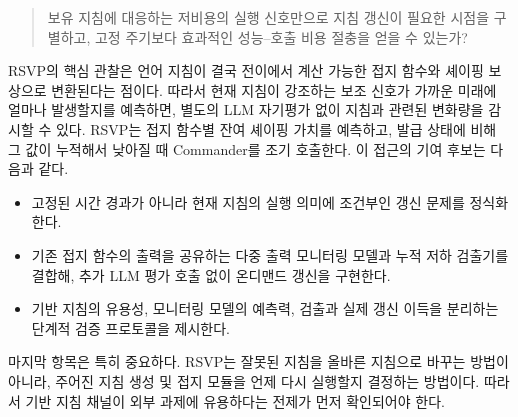 \begin{quote}
보유 지침에 대응하는 저비용의 실행 신호만으로 지침 갱신이 필요한 시점을 구별하고,
고정 주기보다 효과적인 성능--호출 비용 절충을 얻을 수 있는가?
\end{quote}

RSVP의 핵심 관찰은 언어 지침이 결국 전이에서 계산 가능한 접지 함수와 셰이핑 보상으로
변환된다는 점이다. 따라서 현재 지침이 강조하는 보조 신호가 가까운 미래에 얼마나
발생할지를 예측하면, 별도의 LLM 자기평가 없이 지침과 관련된 변화량을 감시할 수 있다.
RSVP는 접지 함수별 잔여 셰이핑 가치를 예측하고, 발급 상태에 비해 그 값이 누적해서
낮아질 때 Commander를 조기 호출한다. 이 접근의 기여 후보는 다음과 같다.

\begin{itemize}
  \item 고정된 시간 경과가 아니라 현재 지침의 실행 의미에 조건부인 갱신 문제를
        정식화한다.
  \item 기존 접지 함수의 출력을 공유하는 다중 출력 모니터링 모델과 누적 저하
        검출기를 결합해, 추가 LLM 평가 호출 없이 온디맨드 갱신을 구현한다.
  \item 기반 지침의 유용성, 모니터링 모델의 예측력, 검출과 실제 갱신 이득을 분리하는
        단계적 검증 프로토콜을 제시한다.
\end{itemize}

마지막 항목은 특히 중요하다. RSVP는 잘못된 지침을 올바른 지침으로 바꾸는 방법이
아니라, 주어진 지침 생성 및 접지 모듈을 언제 다시 실행할지 결정하는 방법이다.
따라서 기반 지침 채널이 외부 과제에 유용하다는 전제가 먼저 확인되어야 한다.
